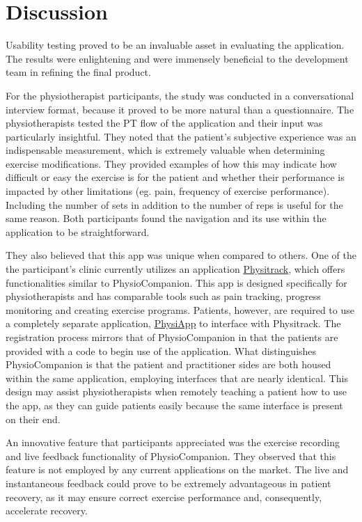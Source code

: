 \documentclass[12pt, titlepage]{article}
\begin{document}

\section{Discussion}

Usability testing proved to be an invaluable asset in evaluating the application. The results were 
enlightening and were immensely beneficial to the development team in refining the final product.

For the physiotherapist participants, the study was conducted in a conversational interview format, because it proved to be 
more natural than a questionnaire. The physiotherapists tested the PT flow of the application and their input was 
particularly insightful. They noted that the patient's subjective experience was an indispensable measurement, 
which is extremely valuable when determining exercise modifications. They provided examples of how this 
may indicate how difficult or easy the exercise is for the patient and whether their performance
is impacted by other limitations (eg. pain, frequency of exercise performance). Including the number of sets in addition 
to the number of reps is useful for the same reason. Both participants found the navigation and its use within 
the application to be straightforward. 

They also believed that this app was unique when compared to others.
One of the the participant's clinic currently utilizes an application \href{https://www.physitrack.com/en-ca}{Physitrack},
which offers functionalities similar to PhysioCompanion. This app is designed specifically for physiotherapists 
and has comparable tools such as pain tracking, progress monitoring and creating exercise programs. Patients, however, 
are required to use a completely separate application, \href{https://www.physiapp.com}{PhysiApp} to interface with Physitrack. 
The registration process mirrors that of PhysioCompanion in that the patients are provided with a code to begin use of the 
application. What distinguishes PhysioCompanion is that the patient and practitioner sides are both housed within the same application, 
employing interfaces that are nearly identical. This design may assist physiotherapists when remotely teaching a patient 
how to use the app, as they can guide patients easily because the same interface is present on their end.

An innovative feature that participants appreciated was the exercise recording and live feedback functionality of 
PhysioCompanion. They observed that this feature is not employed by any current applications on the market. The
live and instantaneous feedback could prove to be extremely advantageous in patient recovery, as it may ensure correct 
exercise performance and, consequently, accelerate recovery.
\end{document}
